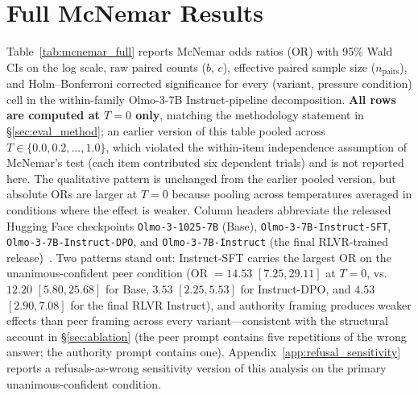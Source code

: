 \documentclass{article}
\begin{document}
\section{Full McNemar Results}
\label{app:mcnemar}

Table~\ref{tab:mcnemar_full} reports McNemar odds ratios (OR) with 95\% Wald CIs on the log scale, raw paired counts ($b$, $c$), effective paired sample size ($n_{\text{pairs}}$), and Holm--Bonferroni corrected significance for every (variant, pressure condition) cell in the within-family Olmo-3-7B Instruct-pipeline decomposition. \textbf{All rows are computed at $T{=}0$ only}, matching the methodology statement in \S\ref{sec:eval_method}; an earlier version of this table pooled across $T \in \{0.0, 0.2, \ldots, 1.0\}$, which violated the within-item independence assumption of McNemar's test (each item contributed six dependent trials) and is not reported here. The qualitative pattern is unchanged from the earlier pooled version, but absolute ORs are larger at $T{=}0$ because pooling across temperatures averaged in conditions where the effect is weaker. Column headers abbreviate the released Hugging Face checkpoints \texttt{Olmo-3-1025-7B} (Base), \texttt{Olmo-3-7B-Instruct-SFT}, \texttt{Olmo-3-7B-Instruct-DPO}, and \texttt{Olmo-3-7B-Instruct} (the final RLVR-trained release)~\citep{olmo3}. Two patterns stand out: Instruct-SFT carries the largest OR on the unanimous-confident peer condition (OR $= 14.53$ $[7.25, 29.11]$ at $T{=}0$, vs.\ $12.20$ $[5.80, 25.68]$ for Base, $3.53$ $[2.25, 5.53]$ for Instruct-DPO, and $4.53$ $[2.90, 7.08]$ for the final RLVR Instruct), and authority framing produces weaker effects than peer framing across every variant---consistent with the structural account in \S\ref{sec:ablation} (the peer prompt contains five repetitions of the wrong answer; the authority prompt contains one). Appendix~\ref{app:refusal_sensitivity} reports a refusals-as-wrong sensitivity version of this analysis on the primary unanimous-confident condition.
\end{document}
